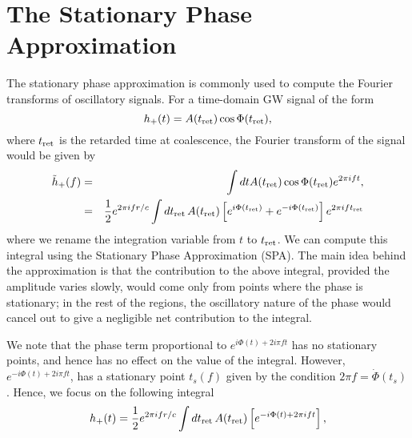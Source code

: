 
\chapter{The Stationary Phase Approximation}

The stationary phase approximation is commonly used to compute the Fourier
transforms of oscillatory signals. For a time-domain GW signal of the form
\begin{equation}
h_{+}(t) = A(t_{\rm ret}) \cos\Phi(t_{\rm ret}), 
\end{equation}
where $t_{\rm ret}$ is the retarded time at coalescence, the Fourier 
transform of the signal would be given by
\begin{eqnarray}
\tilde{h}_{+}(f) &=& \int dt A(t_{\rm ret}) \cos\Phi(t_{\rm ret}) e^{2\pi i f t},\\
 &=& \dfrac{1}{2} e^{2\pi i f r/c} \int dt_{\rm ret}\, A(t_{\rm ret}) \left[
 e^{i \Phi(t_{\rm ret})} + e^{-i \Phi(t_{\rm ret})} \right] e^{2\pi i f t_{\rm
 ret}} \nonumber
 \label{td}
\end{eqnarray}
where we rename the integration variable from $t$ to $t_{\rm ret}$. We can
compute this integral using the Stationary Phase Approximation (SPA). The main
idea behind the approximation is that the contribution to the above integral,
provided the amplitude varies slowly, would come only from points where the
phase is stationary; in the rest of the regions, the oscillatory nature of the
phase would cancel out to give a negligible net contribution to the integral.

We note that the phase term proportional to $e^{i \Phi(t) + 2 i \pi f
t}$ has no stationary points, and hence has no effect on the value of the
integral. However, $e^{-i \Phi(t) + 2 i \pi f t}$, has a stationary
point $t_s (f)$ given by the condition $2 \pi f = \dot{\Phi}(t_s)$. Hence, we 
focus on the following integral
\begin{equation}
h_{+}(t) = \dfrac{1}{2} e^{2\pi i f r/c} \int dt_{\rm ret}\, A(t_{\rm ret})
 \left[e^{-i \Phi(t) + 2\pi i f t} \right]  \nonumber,
\end{equation}


